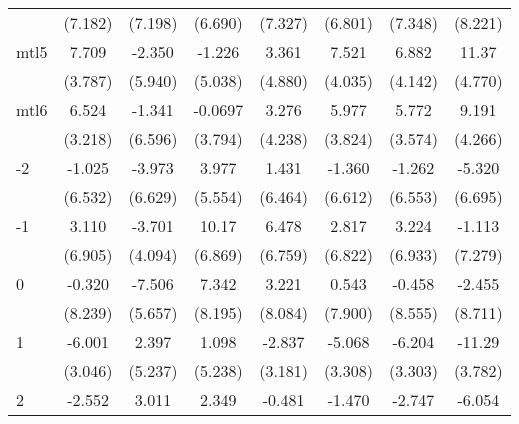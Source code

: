 \documentclass{article}
\begin{document}
{\begin{longtable}{l*{7}{c}}
                &  (7.182)         &  (7.198)         &  (6.690)         &  (7.327)         &  (6.801)         &  (7.348)         &  (8.221)         \\
mtl5            &    7.709         &   -2.350         &   -1.226         &    3.361         &    7.521         &    6.882         &    11.37\sym{*}  \\
                &  (3.787)         &  (5.940)         &  (5.038)         &  (4.880)         &  (4.035)         &  (4.142)         &  (4.770)         \\
mtl6            &    6.524         &   -1.341         &  -0.0697         &    3.276         &    5.977         &    5.772         &    9.191\sym{*}  \\
                &  (3.218)         &  (6.596)         &  (3.794)         &  (4.238)         &  (3.824)         &  (3.574)         &  (4.266)         \\
-2              &   -1.025         &   -3.973         &    3.977         &    1.431         &   -1.360         &   -1.262         &   -5.320         \\
                &  (6.532)         &  (6.629)         &  (5.554)         &  (6.464)         &  (6.612)         &  (6.553)         &  (6.695)         \\
-1              &    3.110         &   -3.701         &    10.17         &    6.478         &    2.817         &    3.224         &   -1.113         \\
                &  (6.905)         &  (4.094)         &  (6.869)         &  (6.759)         &  (6.822)         &  (6.933)         &  (7.279)         \\
0               &   -0.320         &   -7.506         &    7.342         &    3.221         &    0.543         &   -0.458         &   -2.455         \\
                &  (8.239)         &  (5.657)         &  (8.195)         &  (8.084)         &  (7.900)         &  (8.555)         &  (8.711)         \\
1               &   -6.001         &    2.397         &    1.098         &   -2.837         &   -5.068         &   -6.204         &   -11.29\sym{**} \\
                &  (3.046)         &  (5.237)         &  (5.238)         &  (3.181)         &  (3.308)         &  (3.303)         &  (3.782)         \\
2               &   -2.552         &    3.011         &    2.349         &   -0.481         &   -1.470         &   -2.747         &   -6.054         \\

\end{longtable}}
\end{document}
